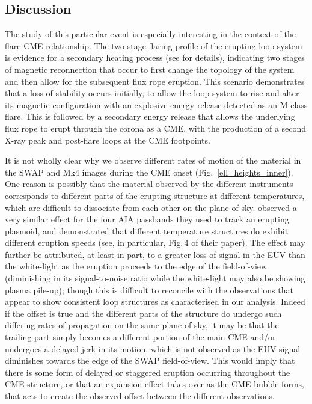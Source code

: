\documentclass[namedreferences]{solarphysics}
\begin{document}
\begin{article}
\section{Discussion}
\label{sect:discussion}

The study of this particular event is especially interesting in the context of the flare-CME relationship. The two-stage flaring profile of the erupting loop system is evidence for a secondary heating process (see  for details), indicating two stages of magnetic reconnection that occur to first change the topology of the system and then allow for the subsequent flux rope eruption. This scenario demonstrates that a loss of stability occurs initially, to allow the loop system to rise and alter its magnetic configuration with an explosive energy release detected as an M-class flare. This is followed by a secondary energy release that allows the underlying flux rope to erupt through the corona as a CME, with the production of a second X-ray peak and post-flare loops at the CME footpoints.


{\bf 

It is not wholly clear why we observe different rates of motion of the material in the SWAP and Mk4 images during the CME onset (Fig.~\ref{ell_heights_inner}). One reason is possibly that the material observed by the different instruments corresponds to different parts of the erupting structure at different temperatures, which are difficult to dissociate from each other on the plane-of-sky.  observed a very similar effect for the four AIA passbands they used to track an erupting plasmoid, and demonstrated that different temperature structures do exhibit different eruption speeds (see, in particular, Fig.\,4 of their paper). The effect may further be attributed, at least in part, to a greater loss of signal in the EUV than the white-light as the eruption proceeds to the edge of the field-of-view (diminishing in its signal-to-noise ratio while the white-light may also be showing plasma pile-up); though this is difficult to reconcile with the observations that appear to show consistent loop structures as characterised in our analysis. Indeed if the offset is true and the different parts of the structure do undergo such differing rates of propagation on the same plane-of-sky, it may be that the trailing part simply becomes a different portion of the main CME and/or undergoes a delayed jerk in its motion, which is not observed as the EUV signal diminishes towards the edge of the SWAP field-of-view. This would imply that there is some form of delayed or staggered eruption occurring throughout the CME structure, or that an expansion effect takes over as the CME bubble forms, that acts to create the observed offset between the different observations. 



}
\end{article}
\end{document}
